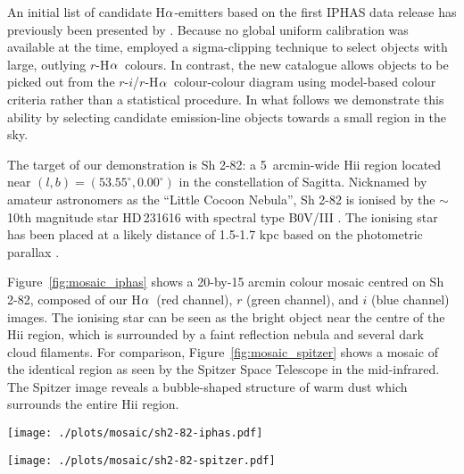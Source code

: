 \documentclass[useAMS,usenatbib]{mn2e}
\def\ha{\mbox{H$\rm \alpha$}}
\def\micron{\mbox{$\mu$m}}
\begin{document}
An initial list of candidate \ha-emitters
based on the first IPHAS data release has previously
been presented by \cite{Witham2008}. 
Because no global uniform calibration was available
at the time, \citeauthor{Witham2008} employed 
a sigma-clipping technique to select objects with
large, outlying $r$-\ha\ colours.
In contrast, the new catalogue
allows objects to be picked out
from the $r$-$i$/$r$-\ha\ colour-colour diagram
using model-based colour criteria
rather than a statistical procedure.
In what follows we demonstrate this ability 
by selecting candidate emission-line objects
towards a small region in the sky.

The target of our demonstration is Sh 2-82:
a 5~arcmin-wide H{\sc ii} region located near $(l,b)=(53.55^\circ, 0.00^\circ)$
in the constellation of Sagitta.
Nicknamed by amateur astronomers as the ``Little Cocoon Nebula'',
Sh 2-82 is ionised by 
the $\sim$10th magnitude star HD\,231616
with spectral type B0V/III
\citep{Georgelin1973,Mayer1973,Hunter1990}.
The ionising star has been placed at a likely distance of 1.5-1.7 kpc
based on the photometric parallax
\citep{Mayer1973,Lahulla1985,Hunter1990}.

Figure~\ref{fig:mosaic_iphas} shows a 20-by-15 arcmin
colour mosaic centred on Sh 2-82,
composed of our \ha\ (red channel),
$r$ (green channel),
and $i$ (blue channel) images.
The ionising star can be seen as the bright object
near the centre of the H{\sc ii} region,
which is surrounded by a faint reflection nebula
and several dark cloud filaments.
For comparison, Figure~\ref{fig:mosaic_spitzer} shows
a mosaic of the identical region 
as seen by the Spitzer Space Telescope
in the mid-infrared. The Spitzer image
reveals a bubble-shaped structure of warm dust
which surrounds the entire H{\sc ii} region.

\begin{figure*}
    \begin{minipage}[b]{0.8\linewidth}
        \texttt{[image: ./plots/mosaic/sh2-82-iphas.pdf]} 
    \end{minipage}
\caption{IPHAS-based mosaic of H{\sc ii} region Sh 2-82,
composed of \ha\ (red channel), $r$ (green channel) and $i$ (blue channel). Yellow triangles show the position of candidate \ha-emitters
which have been selected from the colour-colour diagram
in Figure~\ref{fig:emitters}. Note that the H{\sc ii} region is surrounded by a faint blue/green reflection nebula
and dark cloud filaments.}
\label{fig:mosaic_iphas}
    \begin{minipage}[b]{0.8\linewidth}
        \texttt{[image: ./plots/mosaic/sh2-82-spitzer.pdf]} 
    \end{minipage}
    \caption{Star-forming region Sh 2-82 as seen in the mid-infrared
    by the Spitzer Space Telescope. The mosaic is composed of the 24\,\micron\ (red), 8.0\,\micron\ (green) and 4.5\,\micron\ (blue) bands.
    The image reveals a bubble-shaped structure which surrounds the {\sc Hii} region that is seen in the IPHAS mosaic of the same region (Figure~\ref{fig:mosaic_iphas}).}
    \label{fig:mosaic_spitzer}
\end{figure*}
\end{document}
